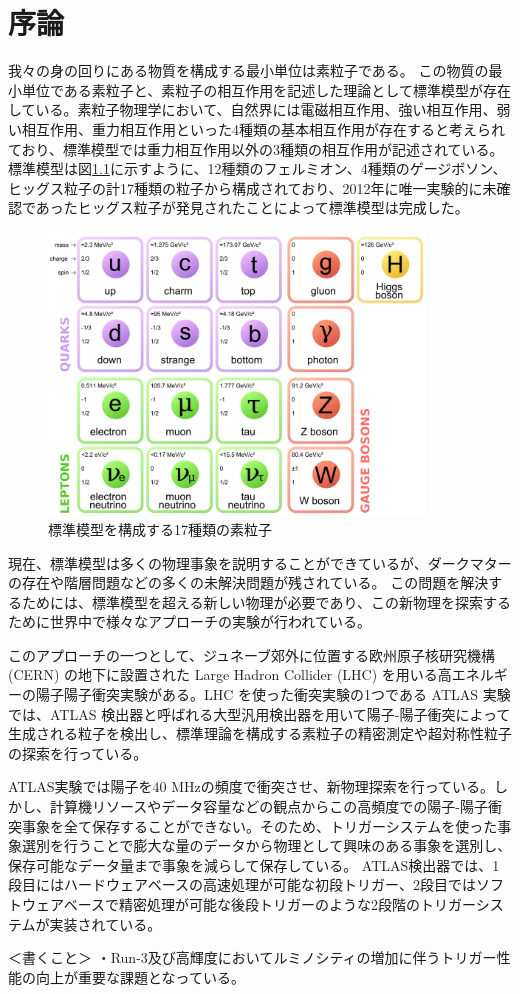 \chapter{序論}
我々の身の回りにある物質を構成する最小単位は素粒子である。
この物質の最小単位である素粒子と、素粒子の相互作用を記述した理論として標準模型が存在している。素粒子物理学において、自然界には電磁相互作用、強い相互作用、弱い相互作用、重力相互作用といった4種類の基本相互作用が存在すると考えられており、標準模型では重力相互作用以外の3種類の相互作用が記述されている。
標準模型は図\ref{fig:標準模型}に示すように、12種類のフェルミオン、4種類のゲージボソン、ヒッグス粒子の計17種類の粒子から構成されており、2012年に唯一実験的に未確認であったヒッグス粒子が発見されたことによって標準模型は完成した。
\begin{figure}[tb]
  \centering
  \includegraphics[clip, width=10cm]{fig/1/standardmodel.jpg}
  \caption{標準模型を構成する17種類の素粒子}
  \label{fig:標準模型}
\end{figure}


現在、標準模型は多くの物理事象を説明することができているが、ダークマターの存在や階層問題などの多くの未解決問題が残されている。
この問題を解決するためには、標準模型を超える新しい物理が必要であり、この新物理を探索するために世界中で様々なアプローチの実験が行われている。

このアプローチの一つとして、ジュネーブ郊外に位置する欧州原子核研究機構 (CERN) の地下に設置された Large Hadron Collider (LHC) を用いる高エネルギーの陽子陽子衝突実験がある。LHC を使った衝突実験の1つである ATLAS 実験では、ATLAS 検出器と呼ばれる大型汎用検出器を用いて陽子-陽子衝突によって生成される粒子を検出し、標準理論を構成する素粒子の精密測定や超対称性粒子の探索を行っている。

ATLAS実験では陽子を$40$ MHzの頻度で衝突させ、新物理探索を行っている。しかし、計算機リソースやデータ容量などの観点からこの高頻度での陽子-陽子衝突事象を全て保存することができない。そのため、トリガーシステムを使った事象選別を行うことで膨大な量のデータから物理として興味のある事象を選別し、保存可能なデータ量まで事象を減らして保存している。
ATLAS検出器では、1段目にはハードウェアベースの高速処理が可能な初段トリガー、2段目ではソフトウェアベースで精密処理が可能な後段トリガーのような2段階のトリガーシステムが実装されている。







＜書くこと＞
・Run-3及び高輝度においてルミノシティの増加に伴うトリガー性能の向上が重要な課題となっている。





